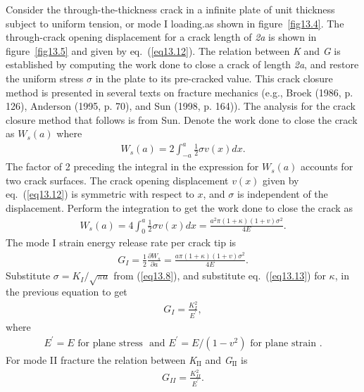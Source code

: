 \documentclass{AeroStructure-ERJohnson}
\begin{document}
Consider the through-the-thickness crack in a infinite plate of unit thickness subject to uniform tension, or mode I loading.as shown in figure~\ref{fig13.4}. The through-crack opening displacement for a crack length of \textit{2a} is shown in figure~\ref{fig13.5} and given by eq.~(\ref{eq13.12}). The relation between \textit{K} and \textit{G} is established by computing the work done to close a crack of length \textit{2a}, and restore the uniform stress $\sigma$ in the plate to its pre-cracked value. This crack closure method is presented in several texts on fracture mechanics (e.g., Broek (1986, p. 126), Anderson (1995, p. 70), and Sun (1998, p. 164)). The analysis for the crack closure method that follows is from Sun. Denote the work done to close the crack as $W_{s}(a)$ where
\begin{align}\label{eq13.35}
W_{s}(a)=2 \int_{-a}^{a} \frac{1}{2} \sigma v(x) d x.
\end{align}
The factor of 2 preceding the integral in the expression for $W_{s}(a)$ accounts for two crack surfaces. The crack opening displacement $v(x)$ given by eq.~(\ref{eq13.12}) is symmetric with respect to $x$, and $\sigma$ is independent of the displacement. Perform the integration to get the work done to close the crack as
\begin{align}\label{eq13.36}
W_{s}(a)=4 \int_{0}^{a} \frac{1}{2} \sigma v(x) d x=\frac{a^{2} \pi(1+\kappa)(1+v) \sigma^{2}}{4 E}.
\end{align}
The mode I strain energy release rate per crack tip is
\begin{align}\label{eq13.37}
G_{I}=\frac{1}{2} \frac{\partial W_{s}}{\partial a}=\frac{a \pi(1+\kappa)(1+v) \sigma^{2}}{4 E}.
\end{align}
Substitute $\sigma=K_{I}/\sqrt{\pi a}$ from (\ref{eq13.8}), and substitute eq.~(\ref{eq13.13}) for $\kappa$, in the previous equation to get
\begin{align}\label{eq13.38}
G_{I}=\frac{K_{I}^{2}}{E^{\prime}},
\end{align}
where
\begin{align}\label{eq13.39}
E^{\prime}=E \text { for plane stress } \textrm{ and } E^{\prime}=E /(1-v^{2}) \text { for plane strain }.
\end{align}
For mode II fracture the relation between \textit{K}$_\textrm{II}$ and \textit{G}$_\textrm{II}$ is
\begin{align}\label{eq13.40}
G_{I I}=\frac{K_{I I}^{2}}{E^{\prime}}.
\end{align}
\vspace*{3pt}\vspace*{-7pt}
\pagebreak
\end{document}
